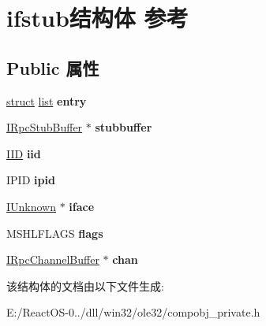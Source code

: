 \hypertarget{structifstub}{}\section{ifstub结构体 参考}
\label{structifstub}
\subsection*{Public 属性}
\begin{DoxyCompactItemize}
\item 
\mbox{\label{structifstub_a84b0afbeb45716144eca50e9c22fb4fa}} 
\hyperlink{interfacestruct}{struct} \hyperlink{classlist}{list} {\bfseries entry}
\item 
\mbox{\label{structifstub_abbf5a19a6271497433d643e2216e2d22}} 
\hyperlink{interface_i_rpc_stub_buffer}{I\+Rpc\+Stub\+Buffer} $\ast$ {\bfseries stubbuffer}
\item 
\mbox{\label{structifstub_a7939e8da5a2eba47e3ee28039cf63830}} 
\hyperlink{struct___i_i_d}{I\+ID} {\bfseries iid}
\item 
\mbox{\label{structifstub_a0809fc174f2742135218627488b3de4a}} 
I\+P\+ID {\bfseries ipid}
\item 
\mbox{\label{structifstub_ab5436b347d40d2d2a0f2502af860cc8c}} 
\hyperlink{interface_i_unknown}{I\+Unknown} $\ast$ {\bfseries iface}
\item 
\mbox{\label{structifstub_ad30db7db568755d171f0c9df0f299e5e}} 
M\+S\+H\+L\+F\+L\+A\+GS {\bfseries flags}
\item 
\mbox{\label{structifstub_af7ffaeb4d47227e97899b96fefa82def}} 
\hyperlink{interface_i_rpc_channel_buffer}{I\+Rpc\+Channel\+Buffer} $\ast$ {\bfseries chan}
\end{DoxyCompactItemize}


该结构体的文档由以下文件生成\+:\begin{DoxyCompactItemize}
\item 
E\+:/\+React\+O\+S-\/0../dll/win32/ole32/compobj\+\_\+private.\+h\end{DoxyCompactItemize}
